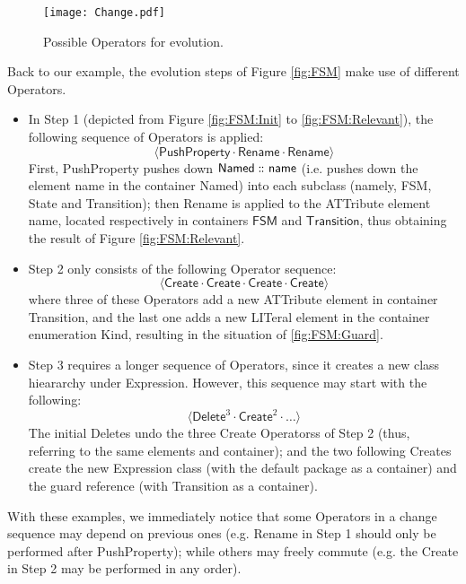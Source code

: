 \begin{figure}[t]
    \centering
    \texttt{[image: Change.pdf]}
    \caption{Possible \textsf{Operator}s for \metamodel evolution.}
    \label{fig:Operator}
\end{figure}

Back to our example, the evolution steps of Figure \ref{fig:FSM} make use of different \textsf{Operator}s.
\begin{itemize}
	\item In Step 1 (depicted from Figure \ref{fig:FSM:Init} to \ref{fig:FSM:Relevant}),
	the following sequence of \textsf{Operator}s is applied:
	$$\langle \mathsf{PushProperty} \cdot \mathsf{Rename} \cdot \mathsf{Rename} \rangle$$
	First, \textsf{PushProperty} pushes down $\mathsf{Named} \,\colon\!\!\!\colon \mathsf{name}$
	(i.e. pushes down the \textsf{element} \textsf{name} in the \textsf{container}
	\textsf{Named})
	into each subclass (namely, \textsf{FSM}, \textsf{State} and \textsf{Transition});
	then \textsf{Rename} is applied to the \textsf{ATT}ribute \textsf{element} 
	\textsf{name}, located respectively in \textsf{container}s $\mathsf{FSM}$ and 
	$\mathsf{Transition}$, thus obtaining the result of Figure \ref{fig:FSM:Relevant}.
	
	\item Step 2 only consists of the following \textsf{Operator} sequence:
	$$\langle \mathsf{Create} \cdot \mathsf{Create} \cdot \mathsf{Create} \cdot \mathsf{Create} \rangle$$
	where three of these \textsf{Operator}s add a new \textsf{ATT}ribute \textsf{element}
	in \textsf{container} \textsf{Transition}, and the last one adds a new 
	\textsf{LIT}eral \textsf{element} in the \textsf{container} enumeration \textsf{Kind},
	resulting in the situation of \autoref{fig:FSM:Guard}.
	
	\item Step 3 requires a longer sequence of \textsf{Operator}s, since it creates
	a new class hieararchy under \textsf{Expression}. However, this sequence may
	start with the following:
	$$\langle \mathsf{Delete}^3 \cdot \mathsf{Create}^2 \cdot \ldots \rangle$$
	The initial \textsf{Delete}s undo the three \textsf{Create} \textsf{Operators}s 
	of Step 2
	(thus, referring to the same \textsf{element}s and \textsf{container}); and
	the two following \textsf{Create}s create the new \textsf{Expression} class
	(with the default package as a \textsf{container}) and the \textsf{guard}
	reference (with \textsf{Transition} as a \textsf{container}).
\end{itemize}
With these examples, we immediately notice that some \textsf{Operator}s
in a change sequence may depend on previous ones (e.g. \textsf{Rename}
in Step 1 should only be performed after \textsf{PushProperty}); while others
may freely commute (e.g. the \textsf{Create} in Step 2 may be performed in any 
order).
